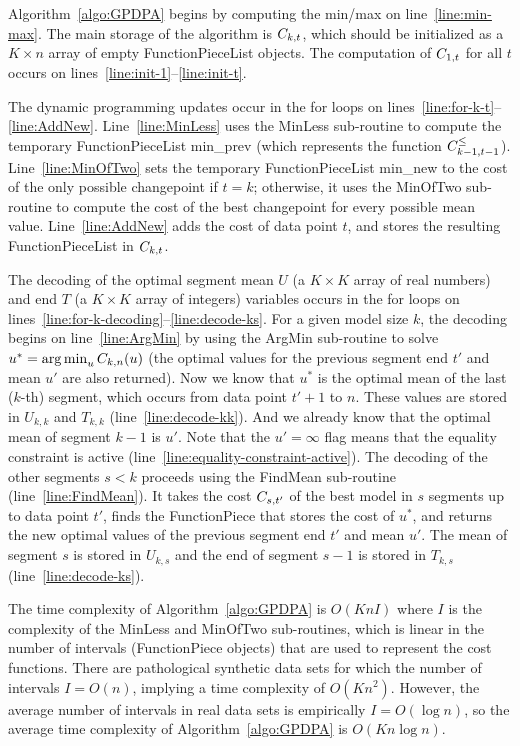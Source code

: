 \documentclass{article}
\DeclareMathOperator*{\argmin}{arg\,min}
\begin{document}
Algorithm~\ref{algo:GPDPA} begins by computing the min/max on
line~\ref{line:min-max}.  The main storage of the algorithm is
$C_{k,t}$, which should be initialized as a $K\times n$ array of
empty FunctionPieceList objects. The computation of $C_{1,t}$ for
all $t$ occurs on lines~\ref{line:init-1}--\ref{line:init-t}. 

The dynamic programming updates occur in the for loops on
lines~\ref{line:for-k-t}--\ref{line:AddNew}. Line~\ref{line:MinLess}
uses the MinLess sub-routine to compute the temporary
FunctionPieceList min\_prev (which represents the function
$C_{k-1,t-1}^\leq$). Line~\ref{line:MinOfTwo} sets the temporary
FunctionPieceList min\_new to the cost of the only possible
changepoint if $t=k$; otherwise, it uses the MinOfTwo sub-routine to
compute the cost of the best changepoint for every possible mean
value. Line~\ref{line:AddNew} adds the cost of data point $t$, and
stores the resulting FunctionPieceList in $C_{k,t}$.

The decoding of the optimal segment mean $U$ (a $K\times K$ array of
real numbers) and end $T$ (a $K\times K$ array of integers) variables
occurs in the for loops on
lines~\ref{line:for-k-decoding}--\ref{line:decode-ks}. For a given
model size $k$, the decoding begins on line~\ref{line:ArgMin} by using
the ArgMin sub-routine to solve $u^* = \argmin_u \FCC_{k,n}(u)$ (the
optimal values for the previous segment end $t'$ and mean $u'$ are
also returned). Now we know that $u^*$ is the optimal mean of the last
($k$-th) segment, which occurs from data point $t'+1$ to $n$. These
values are stored in $U_{k,k}$ and $T_{k,k}$
(line~\ref{line:decode-kk}). And we already know that the optimal mean
of segment $k-1$ is $u'$.  Note that the $u'=\infty$ flag means that
the equality constraint is active
(line~\ref{line:equality-constraint-active}). The decoding of the
other segments $s<k$ proceeds using the FindMean sub-routine
(line~\ref{line:FindMean}). It takes the cost $C_{s,t'}$ of the
best model in $s$ segments up to data point $t'$, finds the
FunctionPiece that stores the cost of $u^*$, and returns the new
optimal values of the previous segment end $t'$ and mean $u'$. The
mean of segment $s$ is stored in $U_{k,s}$ and the end of segment
$s-1$ is stored in $T_{k,s}$ (line~\ref{line:decode-ks}).

The time complexity of Algorithm~\ref{algo:GPDPA} is $O(K n I)$ where
$I$ is the complexity of the MinLess and MinOfTwo sub-routines, which
is linear in the number of intervals (FunctionPiece objects) that are
used to represent the cost functions. There are pathological synthetic
data sets for which the number of intervals $I=O(n)$, implying a
time complexity of $O(K n^2)$. However, the average number
of intervals in real data sets is empirically $I=O(\log n)$, so the
average time complexity of Algorithm~\ref{algo:GPDPA} is
$O(K n \log n)$.
\end{document}
